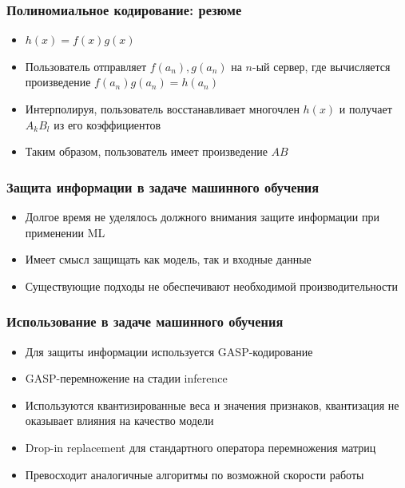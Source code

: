 \documentclass{beamer}
\begin{document}
\begin{frame}
    \frametitle{Полиномиальное кодирование: резюме}

    \begin{itemize}
        \item<1-> $h(x) = f(x)g(x)$ 
        \item<2-> Пользователь отправляет $f(a_n), g(a_n)$ на $n$-ый сервер, где вычисляется произведение $f(a_n)g(a_n) = h(a_n)$
        \item<3-> Интерполируя, пользователь восстанавливает многочлен $h(x)$ и получает $A_k B_l$ из его коэффициентов
        \item<4-> Таким образом, пользователь имеет произведение $AB$

    \end{itemize}

\end{frame}


\begin{frame}
    \frametitle{Защита информации в задаче машинного обучения}

    \begin{itemize}
        \item<1-> Долгое время не уделялось должного внимания защите информации при применении ML  %
        \item<2-> Имеет смысл защищать как модель, так и входные данные %
        \item<3-> Существующие подходы не обеспечивают необходимой производительности %

    \end{itemize}

\end{frame}
\begin{frame}
    \frametitle{Использование в задаче машинного обучения}

    \begin{itemize}
        \item<1-> Для защиты информации используется GASP-кодирование
        \item<2-> GASP-перемножение на стадии inference
        \item<3-> Используются квантизированные веса и значения признаков, квантизация не оказывает влияния на качество модели
        \item<4-> Drop-in replacement для стандартного оператора перемножения матриц 
		\item<5-> Превосходит  аналогичные алгоритмы по возможной скорости работы
    \end{itemize}

\end{frame}
\end{document}
